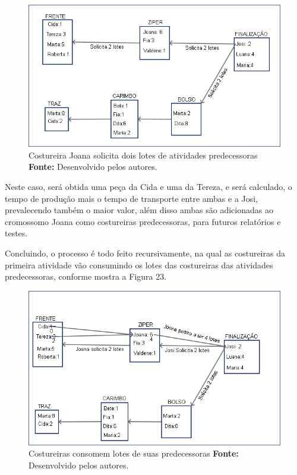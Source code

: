 \begin{figure}[h!]
	\centerline{\includegraphics[scale=0.7]{./imagens/processo_solciitacao_de_lotes2.png}}
	\caption[Distribuição de trabalho]
	{Costureira Joana solicita dois lotes de atividades predecessoras 
	\textbf{Fonte:} Desenvolvido pelos autores.}
	\label{fig:exemplo1}
\end{figure}

\newpage

\par Neste caso, será obtida uma peça da Cida e uma da Tereza, e será calculado,
o tempo de produção mais o tempo de transporte entre ambas e a Josi,
prevalecendo também o maior valor, além disso ambas são adicionadas ao
cromossomo Joana como costureiras predecessoras, para futuros relatórios e
testes.

\par Concluindo, o processo é todo feito recursivamente, na qual as costureiras
da primeira atividade vão consumindo os lotes das costureiras das atividades predecessoras, conforme mostra a Figura 23.


\begin{figure}[h!]
	\centerline{\includegraphics[scale=0.2]{./imagens/processo_solciitacao_de_lotes3.png}}
	\caption[Distribuição de trabalho]
	{Costureiras consomem lotes de suas predecessoras \textbf{Fonte:} Desenvolvido
	pelos autores.}
	\label{fig:exemplo1}
\end{figure}


